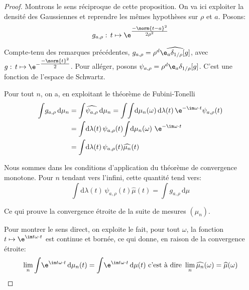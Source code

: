 \begin{proof}
Montrons le sens réciproque de cette proposition. On va ici exploiter la densité des Gaussiennes et reprendre les mêmes hypothèses sur $\rho$ et $a$. 
Posons:
\[
g_{a,\rho}: \, t \mapsto \e^{\tfrac{-\norm{t-a}^2}{2\rho^2}}
\]

Compte-tenu des remarques précédentes, $g_{a,\rho} = \rho^d \widehat{\e_a \delta_{1/\rho}[g]}$, avec $g: \, t \mapsto \e^{-\tfrac{-\norm{t}^2}{2}}$. Pour alléger, posons $\psi_{a,\rho} = \rho^d \e_a \delta_{1/\rho}[g]$. C'est une fonction de l'espace de Schwartz.

\medskip
Pour tout $n$, on a, en exploitant le théorème de Fubini-Tonelli
\begin{align*}
\displaystyle{\int} g_{a,\rho} \, \mathrm d \mu_n & = \displaystyle{\int} \widehat{\psi_{a,\rho}}  \, \mathrm d \mu_n = \displaystyle{\int} \displaystyle{\int} \mathrm d \mu_n(\omega) \, \mathrm d \lambda(t) \, \e^{-\im \omega \cdot t} \psi_{a,\rho} (t) \\
 & = \displaystyle{\int} \mathrm d \lambda(t) \, \psi_{a,\rho} (t) \displaystyle{\int} \mathrm d \mu_n(\omega) \,  \, \e^{-\im \omega \cdot t} \\
 & = \displaystyle{\int} \mathrm d \lambda(t) \, \psi_{a,\rho} (t) \widehat{\mu_n}(t)
\end{align*}

Nous sommes dans les conditions d'application du théorème de convergence monotone. Pour $n$ tendant vers l'infini, cette quantité tend vers:
\[
\displaystyle{\int} \mathrm d \lambda(t) \, \psi_{a,\rho} (t) \widehat{\mu}(t) = \displaystyle{\int} g_{a,\rho} \, \mathrm d \mu
\]

Ce qui prouve la convergence étroite de la suite de mesures $(\mu_n)$.

\medskip
Pour montrer le sens direct, on exploite le fait, pour tout $\omega$, la fonction $t \mapsto \e^{\im t \omega \cdot t}$ est continue et bornée, ce qui donne, en raison de la convergence étroite:
\[
\lim \limits_{n} \displaystyle{\int} \e^{\im t \omega \cdot t} \, \mathrm d \mu_n(t) = \displaystyle{\int} \e^{\im t \omega \cdot t} \, \mathrm d \mu(t) \text{ c'est à dire }\lim \limits_{n} \widehat{\mu_n} (\omega) = \widehat{\mu} (\omega)
\]

\end{proof}


